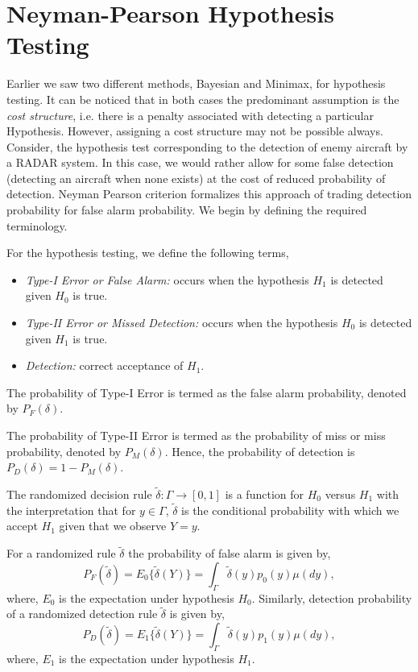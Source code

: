 \documentclass[a4paper,english,12pt]{article}
\begin{document}
\section{Neyman-Pearson Hypothesis Testing}
Earlier we saw two different methods, Bayesian and Minimax, for hypothesis testing. It can be noticed that in both cases the predominant assumption is the \textit{cost structure}, i.e. there is a penalty associated with detecting a particular Hypothesis. 
However, assigning a cost structure may not be possible always. Consider, the hypothesis test corresponding to the detection of enemy aircraft by a RADAR system. In this case, we would rather allow for some false detection (detecting an aircraft when none exists) at the cost of reduced probability of detection. Neyman Pearson criterion formalizes this approach of trading detection probability for false alarm probability. We begin by defining the required terminology.
\begin{defn}
For the hypothesis testing, we define the following terms,
\begin{itemize}
\item \textit{Type-I Error or False Alarm:} occurs when the hypothesis $H_1$ is detected given $H_0$ is true.
\item \textit{Type-II Error or Missed Detection:} occurs when the hypothesis $H_0$ is detected given $H_1$ is true.
\item \textit{Detection:} correct acceptance of $H_1$. 
\end{itemize}
\end{defn}
\begin{defn}
The probability of Type-I Error is termed as the false alarm probability, denoted by $P_F (\delta)$. 
\end{defn}
\begin{defn}
The probability of Type-II Error is termed as the probability of miss or miss probability, denoted by $P_M (\delta)$. Hence, the probability of detection is $P_D(\delta) = 1 - P_M(\delta)$. 
\end{defn}
\begin{defn}
The randomized decision rule $\tilde{\delta}: \Gamma \rightarrow [0,1]$ is a function for $H_0$ versus $H_1$ with the interpretation that for $y \in \Gamma$, $\tilde{\delta}$ is the conditional probability with which we accept $H_1$ given that we observe $Y=y$. 
\end{defn}
For a randomized rule $\tilde{\delta}$ the probability of false alarm is given by, 
\begin{equation}
P_F(\tilde{\delta}) = E_0\{\tilde{\delta}(Y)\} = \int_{\Gamma} \tilde{\delta}(y) p_0(y) \mu (dy),
\end{equation} 
where, $E_0$ is the expectation under hypothesis $H_0$. Similarly, detection probability of a randomized detection rule $\tilde{\delta}$ is given by,
\begin{equation}
P_D(\tilde{\delta}) = E_1\{\tilde{\delta}(Y)\} = \int_{\Gamma} \tilde{\delta}(y) p_1(y) \mu (dy),
\end{equation} 
where, $E_1$ is the expectation under hypothesis $H_1$.
\end{document}
